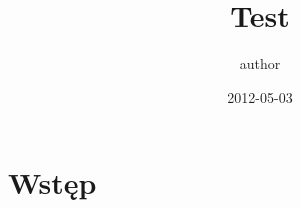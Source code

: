 \documentclass[11pt,a4paper,oneside,titlepage,openany]{book}
\begin{document}
	\pagestyle{plain}
	\begin{titlepage}
	\title{Test}
	\author{author}
	\date{2012-05-03}
	\maketitle
	\end{titlepage}
	\chapter{Wstęp}
	\tableofcontents
\end{document}
